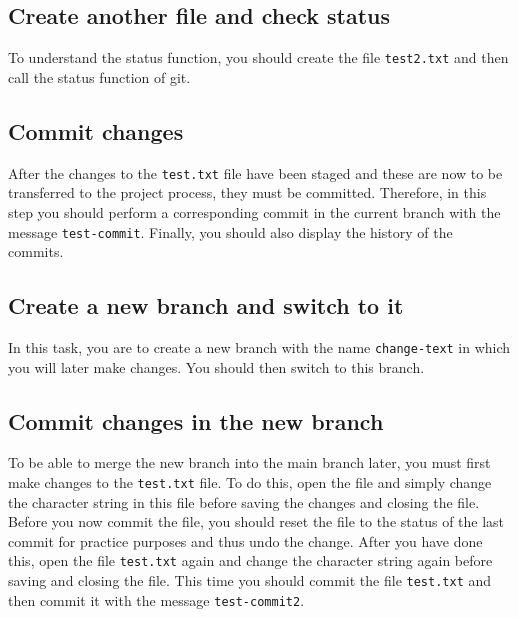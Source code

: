 \documentclass[
  letterpaper,
  DIV=11,
  numbers=noendperiod]{scrreprt}
\begin{document}
\hypertarget{create-another-file-and-check-status}{%
\subsection{Create another file and check
status}\label{create-another-file-and-check-status}}

To understand the status function, you should create the file
\texttt{test2.txt} and then call the status function of git.

\hypertarget{commit-changes}{%
\subsection{Commit changes}\label{commit-changes}}

After the changes to the \texttt{test.txt} file have been staged and
these are now to be transferred to the project process, they must be
committed. Therefore, in this step you should perform a corresponding
commit in the current branch with the message \texttt{test-commit}.
Finally, you should also display the history of the commits.

\hypertarget{create-a-new-branch-and-switch-to-it}{%
\subsection{Create a new branch and switch to
it}\label{create-a-new-branch-and-switch-to-it}}

In this task, you are to create a new branch with the name
\texttt{change-text} in which you will later make changes. You should
then switch to this branch.

\hypertarget{commit-changes-in-the-new-branch}{%
\subsection{Commit changes in the new
branch}\label{commit-changes-in-the-new-branch}}

To be able to merge the new branch into the main branch later, you must
first make changes to the \texttt{test.txt} file. To do this, open the
file and simply change the character string in this file before saving
the changes and closing the file. Before you now commit the file, you
should reset the file to the status of the last commit for practice
purposes and thus undo the change. After you have done this, open the
file \texttt{test.txt} again and change the character string again
before saving and closing the file. This time you should commit the file
\texttt{test.txt} and then commit it with the message
\texttt{test-commit2}.
\end{document}
